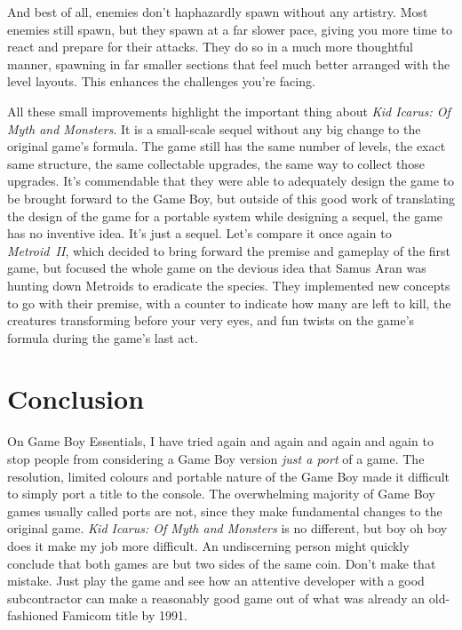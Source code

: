 \documentclass{book}
\begin{document}
And best of all, enemies don’t haphazardly spawn without any artistry. Most enemies still spawn, but they spawn at a far slower pace, giving you more time to react and prepare for their attacks. They do so in a much more thoughtful manner, spawning in far smaller sections that feel much better arranged with the level layouts. This enhances the challenges you’re facing.

All these small improvements highlight the important thing about \emph{Kid Icarus: Of Myth and Monsters}. It is a small-scale sequel without any big change to the original game’s formula. The game still has the same number of levels, the exact same structure, the same collectable upgrades, the same way to collect those upgrades. It’s commendable that they were able to adequately design the game to be brought forward to the Game Boy, but outside of this good work of translating the design of the game for a portable system while designing a sequel, the game has no inventive idea. It’s just a sequel. Let’s compare it once again to \emph{Metroid II}, which decided to bring forward the premise and gameplay of the first game, but focused the whole game on the devious idea that Samus Aran was hunting down Metroids to eradicate the species. They implemented new concepts to go with their premise, with a counter to indicate how many are left to kill, the creatures transforming before your very eyes, and fun twists on the game’s formula during the game’s last act.

\FloatBarrier\needspace{10mm}\section*{Conclusion}\nopagebreak[4]

On Game Boy Essentials, I have tried again and again and again and again to stop people from considering a Game Boy version \emph{just a port} of a game. The resolution, limited colours and portable nature of the Game Boy made it difficult to simply port a title to the console. The overwhelming majority of Game Boy games usually called ports are not, since they make fundamental changes to the original game. \emph{Kid Icarus: Of Myth and Monsters} is no different, but boy oh boy does it make my job more difficult. An undiscerning person might quickly conclude that both games are but two sides of the same coin. Don’t make that mistake. Just play the game and see how an attentive developer with a good subcontractor can make a reasonably good game out of what was already an old-fashioned Famicom title by 1991.
\end{document}
